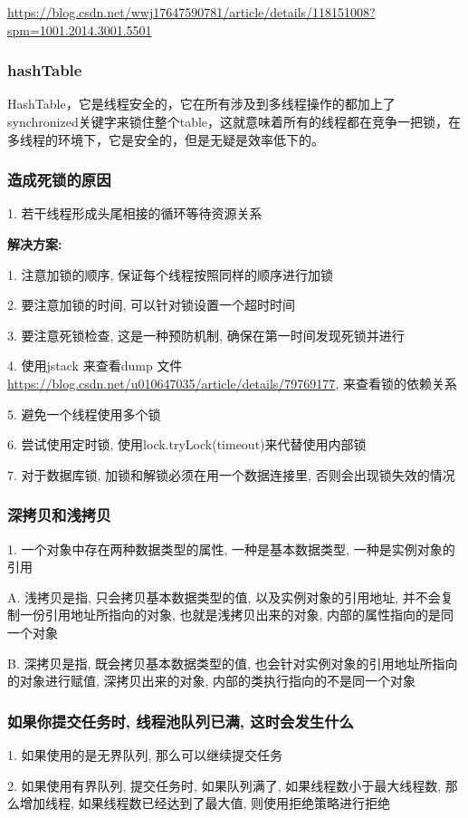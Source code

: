 \documentclass[UTF8]{ctexart}
\begin{document}
\url{https://blog.csdn.net/wwj17647590781/article/details/118151008?spm=1001.2014.3001.5501}

\subsubsection{hashTable}
HashTable，它是线程安全的，它在所有涉及到多线程操作的都加上了synchronized关键字来锁住整个table，这就意味着所有的线程都在竞争一把锁，在多线程的环境下，它是安全的，但是无疑是效率低下的。
\subsubsection{造成死锁的原因}
1. 若干线程形成头尾相接的循环等待资源关系 \par
\textbf{解决方案:} \par
1. 注意加锁的顺序, 保证每个线程按照同样的顺序进行加锁 \par
2. 要注意加锁的时间, 可以针对锁设置一个超时时间 \par
3. 要注意死锁检查, 这是一种预防机制, 确保在第一时间发现死锁并进行 \par
4. 使用jstack 来查看dump 文件 \url{https://blog.csdn.net/u010647035/article/details/79769177}, 来查看锁的依赖关系 \par
5. 避免一个线程使用多个锁 \par
6. 尝试使用定时锁, 使用lock.tryLock(timeout)来代替使用内部锁 \par
7. 对于数据库锁, 加锁和解锁必须在用一个数据连接里, 否则会出现锁失效的情况 \par
\subsubsection{深拷贝和浅拷贝}
1. 一个对象中存在两种数据类型的属性, 一种是基本数据类型, 一种是实例对象的引用 \par
A. 浅拷贝是指, 只会拷贝基本数据类型的值, 以及实例对象的引用地址, 并不会复制一份引用地址所指向的对象, 也就是浅拷贝出来的对象, 内部的属性指向的是同一个对象 \par
B. 深拷贝是指, 既会拷贝基本数据类型的值, 也会针对实例对象的引用地址所指向的对象进行赋值, 深拷贝出来的对象, 内部的类执行指向的不是同一个对象 \par
\subsubsection{如果你提交任务时, 线程池队列已满, 这时会发生什么}
1. 如果使用的是无界队列, 那么可以继续提交任务 \par
2. 如果使用有界队列, 提交任务时, 如果队列满了, 如果线程数小于最大线程数, 那么增加线程, 如果线程数已经达到了最大值, 则使用拒绝策略进行拒绝 \par
\end{document}
